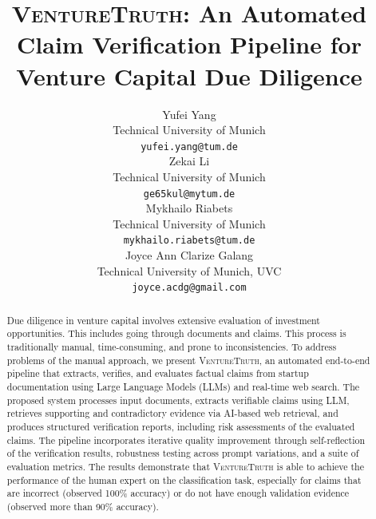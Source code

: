 \documentclass[11pt]{article}
\title{\textsc{VentureTruth}: An Automated Claim Verification
Pipeline for Venture Capital Due Diligence}
\author{Yufei Yang \\
  Technical University of Munich \\
  \texttt{yufei.yang@tum.de} \\\And
  Zekai Li \\
  Technical University of Munich  \\
  \texttt{ge65kul@mytum.de} \\\AND
  Mykhailo Riabets \\
  Technical University of Munich \\
  \texttt{mykhailo.riabets@tum.de} \\\And
  Joyce Ann Clarize Galang \\
  Technical University of Munich, UVC \\
  \texttt{joyce.acdg@gmail.com}
}
\begin{document}
\maketitle

\begin{abstract}
Due diligence in venture capital involves extensive evaluation of investment opportunities. This includes going through documents and claims. This process is traditionally manual, time-consuming, and prone to inconsistencies. To address problems of the manual approach, we present \textsc{VentureTruth}, an automated end-to-end pipeline that extracts, verifies, and evaluates factual claims from startup documentation using Large Language Models (LLMs) and real-time web search. The proposed system processes input documents, extracts verifiable claims using LLM, retrieves supporting and contradictory evidence via AI-based web retrieval, and produces structured verification reports, including risk assessments of the evaluated claims. The pipeline incorporates iterative quality improvement through self-reflection of the verification results, robustness testing across prompt variations, and a suite of evaluation metrics. The results demonstrate that \textsc{VentureTruth} is able to achieve the performance of the human expert on the classification task, especially for claims that are incorrect (observed 100\% accuracy) or do not have enough validation evidence (observed more than 90\% accuracy).
\end{abstract}










\appendix


\end{document}
